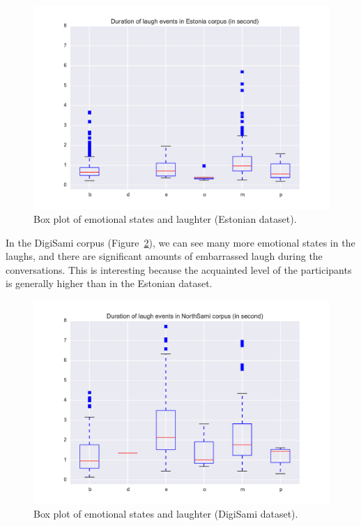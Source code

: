 \documentclass[10pt,journal,compsoc]{IEEEtran}
\begin{document}
\begin{figure}[!t]
\centering
\includegraphics[width=1\linewidth]{figures/estonia/duration_boxplot_emotion.pdf}
\caption{Box plot of emotional states and laughter (Estonian dataset).}
\label{fig:EE-duration-boxplot-emotion}
\end{figure}

In the DigiSami corpus (Figure~\ref{fig:DS-duration-boxplot-emotion}), we can see many more emotional states in the laughs, and there are significant amounts of embarrassed laugh during the conversations. This is interesting because the acquainted level of the participants is generally higher than in the Estonian dataset.

\begin{figure}[!t]
\centering
\includegraphics[width=1\linewidth]{figures/sami/duration_boxplot_emotion.pdf}
\caption{Box plot of emotional states and laughter (DigiSami dataset).}
\label{fig:DS-duration-boxplot-emotion}
\end{figure}
\end{document}
